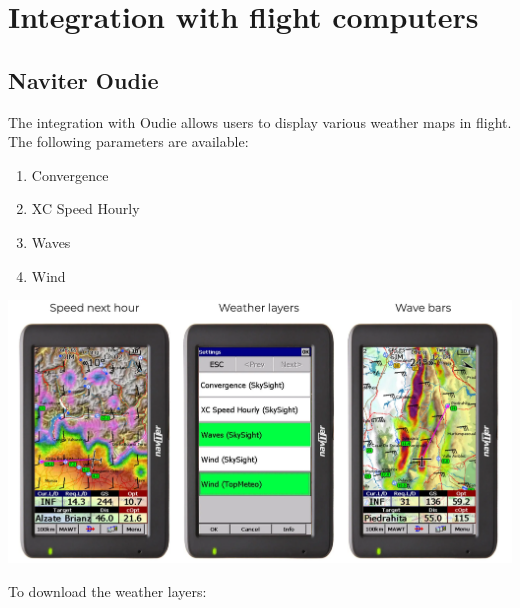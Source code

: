 \documentclass[11pt,a4paper]{article}
\begin{document}
\section{Integration with flight computers}
\subsection{Naviter Oudie}\label{subsec:oudie}
The integration with Oudie allows users to display various weather maps in flight. The following parameters are available:
\begin{enumerate}
\item Convergence
\item XC Speed Hourly
\item Waves
\item Wind
\end{enumerate}

\begin{center}
\includegraphics[width=16cm]{images/oudie.png}
\end{center}

To download the weather layers:
\end{document}
